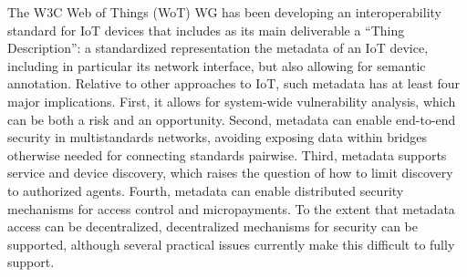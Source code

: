 The W3C Web of Things (WoT) WG has been developing an interoperability standard for IoT devices that includes as
its main deliverable a ``Thing Description'': a standardized representation the metadata of an 
IoT device, including in particular its network interface, but also allowing for semantic annotation.
Relative to other approaches to IoT, such metadata has at least four major implications.
First, it allows for system-wide vulnerability analysis, 
which can be both a risk and an opportunity.
Second, metadata can enable end-to-end security in multistandards networks,
avoiding exposing data within bridges otherwise needed for connecting standards pairwise.
Third, metadata supports service and device discovery,
which raises the question of how to limit discovery to authorized agents.
Fourth, metadata can enable distributed security mechanisms for access control and micropayments.
To the extent that metadata access can be decentralized, decentralized mechanisms for security can
be supported, although several practical issues currently make this difficult to fully support.
